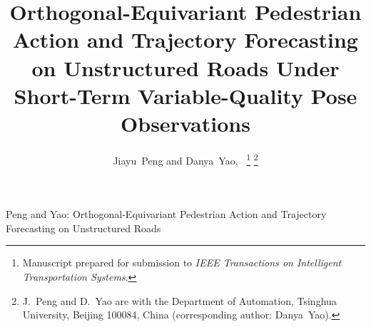 \documentclass[journal]{IEEEtran}
\begin{document}
\title{Orthogonal-Equivariant Pedestrian Action and Trajectory Forecasting on Unstructured Roads Under Short-Term Variable-Quality Pose Observations}

\author{Jiayu~Peng and Danya~Yao,~%
\thanks{Manuscript prepared for submission to \emph{IEEE Transactions on Intelligent Transportation Systems}.}%
\thanks{J.~Peng and D.~Yao are with the Department of Automation, Tsinghua University, Beijing 100084, China (corresponding author: Danya~Yao).}}

%
{Peng and Yao: Orthogonal-Equivariant Pedestrian Action and Trajectory Forecasting on Unstructured Roads}

\maketitle
\end{document}
